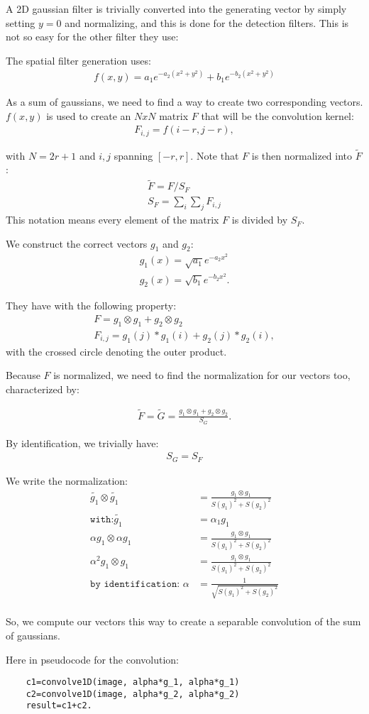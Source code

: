 \documentclass{article}
\begin{document}
A 2D gaussian filter is trivially converted into the generating vector by simply setting $y=0$ and normalizing, and this is done for the detection filters. This is not so easy for the other filter they use:

The spatial filter generation uses:
\begin{align}
    f(x,y)=a_1e^{-a_2(x^2+y^2)}+b_1e^{-b_2(x^2+y^2)}
\end{align}

As a sum of gaussians, we need to find a way to create two corresponding vectors.
$f(x,y)$ is used to create an $NxN$ matrix $F$ that will be the convolution kernel:
\begin{align}
    F_{i,j}=f(i-r,j-r),
\end{align}

with  $N=2r+1$ and $i,j$ spanning $[-r,r]$.
Note that $F$ is then normalized into $\tilde{F}$:
\begin{align}
\tilde{F}=F/S_F\\
S_F=\sum_i\sum_j F_{i,j}
\end{align}
This notation means every element of the matrix $F$ is divided by $S_F$.

We construct the correct vectors $g_1$ and $g_2$:
\begin{align}
g_1(x)=\sqrt{a_1}e^{-a_2x^2}\\
g_2(x)=\sqrt{b_1}e^{-b_2x^2}.
\end{align}

They have with the following property:
\begin{align}
F=g_1\otimes g_1+g_2\otimes g_2\\
F_{i,j}=g_1(j) * g_1(i) + g_2(j) * g_2(i),
\end{align}
with the crossed circle denoting the outer product.

Because $F$ is normalized, we need to find the normalization for our vectors too, characterized by:

\begin{align}
\tilde{F}=\tilde{G}= \frac{g_1\otimes g_1+g_2\otimes g_2}{S_G}.
\end{align}

By identification, we trivially have:
\begin{align}
S_G=S_F
\end{align}

We write the normalization:
\begin{align}
\tilde{g_1}\otimes \tilde{g_1} &=\frac{g_1\otimes g_1}{S(g_1)^2+S(g_2)^2}\\
\texttt{with:} \tilde{g_1} &=\alpha_1 g_1\\
\alpha g_1\otimes \alpha g_1 &=\frac{g_1\otimes g_1}{S(g_1)^2+S(g_2)^2}\\
\alpha^2 g_1\otimes g_1 &=\frac{g_1\otimes g_1}{S(g_1)^2+S(g_2)^2}\\
\texttt{by identification: } \alpha &=\frac{1}{\sqrt{S(g_1)^2+S(g_2)^2}}\\
\end{align}

So, we compute our vectors this way to create a separable convolution of the sum of gaussians.

Here in pseudocode for the convolution:
\begin{lstlisting}
    c1=convolve1D(image, alpha*g_1, alpha*g_1)
    c2=convolve1D(image, alpha*g_2, alpha*g_2)
    result=c1+c2.    
\end{lstlisting}
\end{document}
